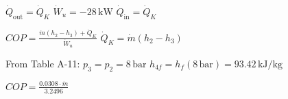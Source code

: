 \( \dot{Q}_{\text{out}} = \dot{Q}_K \)  
\( \dot{W}_u = -28 \, \text{kW} \)  
\( \dot{Q}_{\text{in}} = \dot{Q}_K \)  

\( COP = \frac{\dot{m} (h_2 - h_3) + \dot{Q}_K}{\dot{W}_u} \)  
\( \dot{Q}_K = \dot{m} (h_2 - h_3) \)  

From Table A-11:  
\( p_3 = p_2 = 8 \, \text{bar} \)  
\( h_{4f} = h_f(8 \, \text{bar}) = 93.42 \, \text{kJ/kg} \)  

\( COP = \frac{0.0308 \cdot \dot{m}}{3.2496} \)